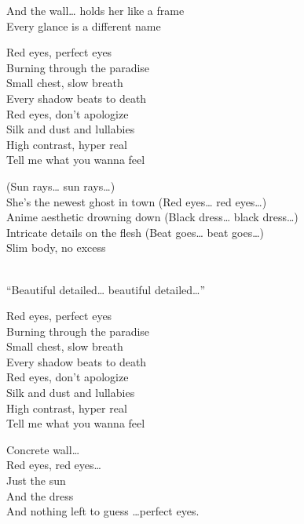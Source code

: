 \begin{lyrics}
And the wall… holds her like a frame\\
Every glance is a different name

Red eyes, perfect eyes\\
Burning through the paradise\\
Small chest, slow breath\\
Every shadow beats to death\\
Red eyes, don’t apologize\\
Silk and dust and lullabies\\
High contrast, hyper real\\
Tell me what you wanna feel

(Sun rays… sun rays…)\\
She’s the newest ghost in town
(Red eyes… red eyes…)\\
Anime aesthetic drowning down
(Black dress… black dress…)\\
Intricate details on the flesh
(Beat goes… beat goes…)\\
Slim body, no excess

\\
“Beautiful detailed… beautiful detailed…”

Red eyes, perfect eyes\\
Burning through the paradise\\
Small chest, slow breath\\
Every shadow beats to death\\
Red eyes, don’t apologize\\
Silk and dust and lullabies\\
High contrast, hyper real\\
Tell me what you wanna feel

Concrete wall…\\
Red eyes, red eyes…\\
Just the sun\\
And the dress\\
And nothing left to guess
 …perfect eyes.
\end{lyrics}

